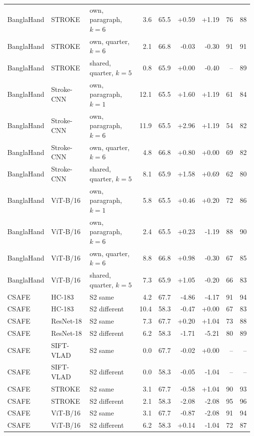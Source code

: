 {\begin{longtable}{lllrrrrrr}
BanglaHand & STROKE & own, paragraph, $k=6$ & 3.6 & 65.5 & +0.59 & +1.19 & 76 & 88 \\
BanglaHand & STROKE & own, quarter, $k=6$ & 2.1 & 66.8 & -0.03 & -0.30 & 91 & 91 \\
BanglaHand & STROKE & shared, quarter, $k=5$ & 0.8 & 65.9 & +0.00 & -0.40 & -- & 89 \\
BanglaHand & Stroke-CNN & own, paragraph, $k=1$ & 12.1 & 65.5 & +1.60 & +1.19 & 61 & 84 \\
BanglaHand & Stroke-CNN & own, paragraph, $k=6$ & 11.9 & 65.5 & +2.96 & +1.19 & 54 & 82 \\
BanglaHand & Stroke-CNN & own, quarter, $k=6$ & 4.8 & 66.8 & +0.80 & +0.00 & 69 & 82 \\
BanglaHand & Stroke-CNN & shared, quarter, $k=5$ & 8.1 & 65.9 & +1.58 & +0.69 & 62 & 80 \\
BanglaHand & ViT-B/16 & own, paragraph, $k=1$ & 5.8 & 65.5 & +0.46 & +0.20 & 72 & 86 \\
BanglaHand & ViT-B/16 & own, paragraph, $k=6$ & 2.4 & 65.5 & +0.23 & -1.19 & 88 & 90 \\
BanglaHand & ViT-B/16 & own, quarter, $k=6$ & 8.8 & 66.8 & +0.98 & -0.30 & 67 & 85 \\
BanglaHand & ViT-B/16 & shared, quarter, $k=5$ & 7.3 & 65.9 & +1.05 & -0.20 & 66 & 83 \\
\midrule
CSAFE & HC-183 & S2 same & 4.2 & 67.7 & -4.86 & -4.17 & 91 & 94 \\
CSAFE & HC-183 & S2 different & 10.4 & 58.3 & -0.47 & +0.00 & 67 & 83 \\
CSAFE & ResNet-18 & S2 same & 7.3 & 67.7 & +0.20 & +1.04 & 73 & 88 \\
CSAFE & ResNet-18 & S2 different & 6.2 & 58.3 & -1.71 & -5.21 & 80 & 89 \\
CSAFE & SIFT-VLAD & S2 same & 0.0 & 67.7 & -0.02 & +0.00 & -- & -- \\
CSAFE & SIFT-VLAD & S2 different & 0.0 & 58.3 & -0.05 & -1.04 & -- & -- \\
CSAFE & STROKE & S2 same & 3.1 & 67.7 & -0.58 & +1.04 & 90 & 93 \\
CSAFE & STROKE & S2 different & 2.1 & 58.3 & -2.08 & -2.08 & 95 & 96 \\
CSAFE & ViT-B/16 & S2 same & 3.1 & 67.7 & -0.87 & -2.08 & 91 & 94 \\
CSAFE & ViT-B/16 & S2 different & 6.2 & 58.3 & +0.14 & -1.04 & 72 & 87 \\
\bottomrule
\end{longtable}
}
